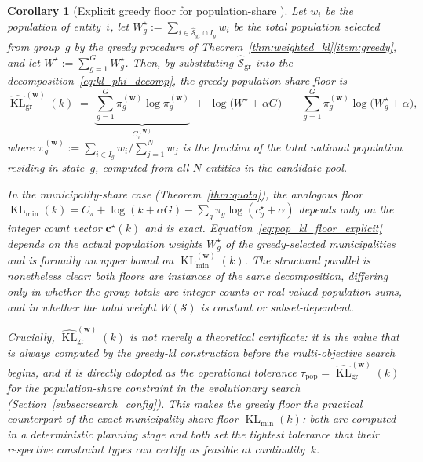\documentclass[10pt,journal]{IEEEtran}
\newcommand{\1}{\mathbf{1}}
\newcommand{\bw}{\mathbf{w}}
\newcommand{\bc}{\mathbf{c}}
\newcommand{\Sel}{\mathcal{S}}
\DeclareMathOperator{\KL}{KL}
\theoremstyle{ieeethm}
\newtheorem{corollary}{Corollary}
\begin{document}
\begin{corollary}[Explicit greedy floor for population-share ]
\label{cor:pop_kl_floor}
Let $w_i$ be the population of entity~$i$, let $W_g^{\star}:=\sum_{i\in\widehat{\Sel}_{\mathrm{gr}}\cap I_g}w_i$ be the total population selected from group~$g$ by the greedy procedure of Theorem~\ref{thm:weighted_kl}\ref{item:greedy}, and let $W^{\star}:=\sum_{g=1}^{G}W_g^{\star}$. Then, by substituting $\widehat{\Sel}_{\mathrm{gr}}$ into the decomposition~\eqref{eq:kl_phi_decomp}, the greedy population-share floor is
\begin{equation}
\label{eq:pop_kl_floor_explicit}
\widehat{\KL}^{(\bw)}_{\mathrm{gr}}(k)
\;=\;
\underbrace{\sum_{g=1}^{G}\pi_g^{(\bw)}\log\pi_g^{(\bw)}}_{C_\pi^{(\bw)}}
\;+\;\log\!\big(W^{\star}+\alpha G\big)
\;-\;\sum_{g=1}^{G}\pi_g^{(\bw)}\log\!\big(W_g^{\star}+\alpha\big),
\end{equation}
where $\pi_g^{(\bw)}:=\sum_{i\in I_g}w_i\big/\sum_{j=1}^{N}w_j$ is the fraction of the total national population residing in state~$g$, computed from all $N$ entities in the candidate pool.

In the municipality-share case (Theorem~\ref{thm:quota}), the analogous floor $\KL_{\min}(k)=C_\pi+\log(k+\alpha G)-\sum_g\pi_g\log(c_g^\star+\alpha)$ depends only on the integer count vector $\bc^\star(k)$ and is exact. Equation~\eqref{eq:pop_kl_floor_explicit} depends on the actual population weights $W_g^{\star}$ of the greedy-selected municipalities and is formally an upper bound on $\KL_{\min}^{(\bw)}(k)$. The structural parallel is nonetheless clear: both floors are instances of the same decomposition, differing only in whether the group totals are integer counts or real-valued population sums, and in whether the total weight $W(\Sel)$ is constant or subset-dependent.

Crucially, $\widehat{\KL}^{(\bw)}_{\mathrm{gr}}(k)$ is not merely a theoretical certificate: it is the value that is \emph{always computed} by the greedy-\gls{kl} construction before the multi-objective search begins, and it is directly adopted as the operational tolerance $\tau_{\mathrm{pop}}=\widehat{\KL}^{(\bw)}_{\mathrm{gr}}(k)$ for the population-share constraint in the evolutionary search (Section~\ref{subsec:search_config}). This makes the greedy floor the practical counterpart of the exact municipality-share floor $\KL_{\min}(k)$: both are computed in a deterministic planning stage and both set the tightest tolerance that their respective constraint types can certify as feasible at cardinality~$k$.
\end{corollary}
\end{document}
